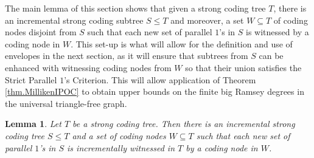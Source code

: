\documentclass{amsart}
\newtheorem{lem}[thm]{Lemma}
\theoremstyle{remark}
\theoremstyle{definition}
\theoremstyle{remark}
\newcommand{\sse}{\subseteq}
\newcommand{\SPOC}{Strict Parallel $1$'s Criterion}
\begin{document}
The main lemma of this section shows  that given a strong coding tree $T$,
there is an incremental strong coding subtree $S\le T$ and
moreover,   a set $W\sse T$ of coding nodes disjoint from $S$ such that
each  new set of parallel $1$'s in $S$ is witnessed by a coding node in $W$.
This set-up is what will allow for the definition and use of envelopes in the next section,
as it will ensure that subtrees from $S$ can be enhanced with witnessing coding nodes from $W$ so that their union satisfies the \SPOC.
This will allow  application of  Theorem
\ref{thm.MillikenIPOC}
to
obtain upper bounds on the finite  big Ramsey degrees in the universal triangle-free graph.






\begin{lem}\label{lem.squiggletree}
Let $T$ be a strong coding tree.
Then there is an incremental strong coding tree $S\le T$ and a set of coding nodes $W\sse T$ such that  each
 new set of parallel $1$'s in $S$ is
 incrementally witnessed in $T$ by  a coding node in $W$.
\end{lem}
\end{document}
